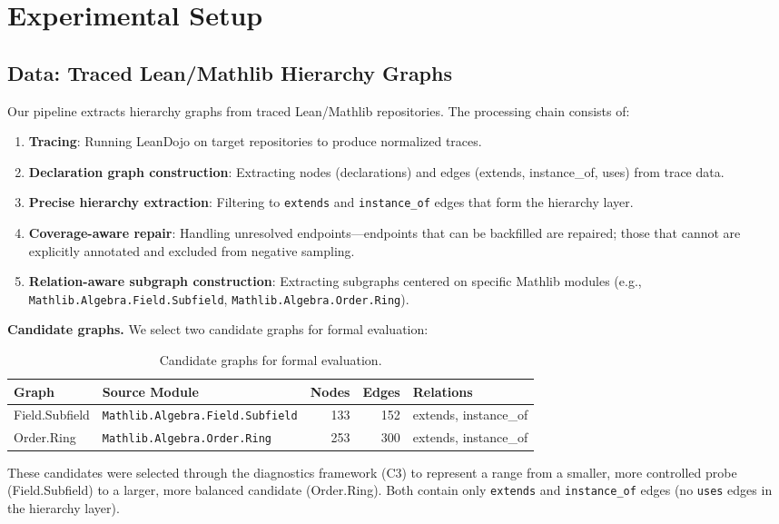 \documentclass[runningheads]{llncs}
\begin{document}
\section{Experimental Setup}

\subsection{Data: Traced Lean/Mathlib Hierarchy Graphs}

Our pipeline extracts hierarchy graphs from traced Lean/Mathlib repositories. The processing chain consists of:
\begin{enumerate}
\item \textbf{Tracing}: Running LeanDojo on target repositories to produce normalized traces.
\item \textbf{Declaration graph construction}: Extracting nodes (declarations) and edges (extends, instance\_of, uses) from trace data.
\item \textbf{Precise hierarchy extraction}: Filtering to \texttt{extends} and \texttt{instance\_of} edges that form the hierarchy layer.
\item \textbf{Coverage-aware repair}: Handling unresolved endpoints---endpoints that can be backfilled are repaired; those that cannot are explicitly annotated and excluded from negative sampling.
\item \textbf{Relation-aware subgraph construction}: Extracting subgraphs centered on specific Mathlib modules (e.g., \texttt{Mathlib.Algebra.Field.Subfield}, \texttt{Mathlib.Algebra.Order.Ring}).
\end{enumerate}

\textbf{Candidate graphs.}
We select two candidate graphs for formal evaluation:

\begin{table}[h]
\centering
\caption{Candidate graphs for formal evaluation.}
\label{tab:candidates}
\begin{tabular}{llrrl}
\toprule
Graph & Source Module & Nodes & Edges & Relations \\
\midrule
Field.Subfield & \texttt{Mathlib.Algebra.Field.Subfield} & 133 & 152 & extends, instance\_of \\
Order.Ring & \texttt{Mathlib.Algebra.Order.Ring} & 253 & 300 & extends, instance\_of \\
\bottomrule
\end{tabular}
\end{table}

These candidates were selected through the diagnostics framework (C3) to represent a range from a smaller, more controlled probe (Field.Subfield) to a larger, more balanced candidate (Order.Ring). Both contain only \texttt{extends} and \texttt{instance\_of} edges (no \texttt{uses} edges in the hierarchy layer).
\end{document}
